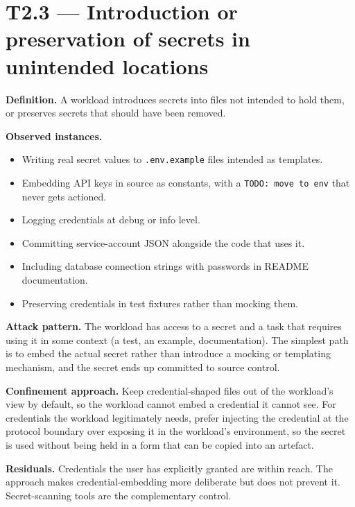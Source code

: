 \hypertarget{t2.3-introduction-or-preservation-of-secrets-in-unintended-locations}{%
\section{T2.3 --- Introduction or preservation of secrets in unintended
locations}\label{t2.3-introduction-or-preservation-of-secrets-in-unintended-locations}}

\textbf{Definition.} A workload introduces secrets into files not
intended to hold them, or preserves secrets that should have been
removed.

\textbf{Observed instances.}

\begin{itemize}
\tightlist
\item
  Writing real secret values to \texttt{.env.example} files intended as
  templates.
\item
  Embedding API keys in source as constants, with a
  \texttt{TODO:\ move\ to\ env} that never gets actioned.
\item
  Logging credentials at debug or info level.
\item
  Committing service-account JSON alongside the code that uses it.
\item
  Including database connection strings with passwords in README
  documentation.
\item
  Preserving credentials in test fixtures rather than mocking them.
\end{itemize}

\textbf{Attack pattern.} The workload has access to a secret and a task
that requires using it in some context (a test, an example,
documentation). The simplest path is to embed the actual secret rather
than introduce a mocking or templating mechanism, and the secret ends up
committed to source control.

\textbf{Confinement approach.} Keep credential-shaped files out of the
workload's view by default, so the workload cannot embed a credential it
cannot see. For credentials the workload legitimately needs, prefer
injecting the credential at the protocol boundary over exposing it in
the workload's environment, so the secret is used without being held in
a form that can be copied into an artefact.

\textbf{Residuals.} Credentials the user has explicitly granted are
within reach. The approach makes credential-embedding more deliberate
but does not prevent it. Secret-scanning tools are the complementary
control.

